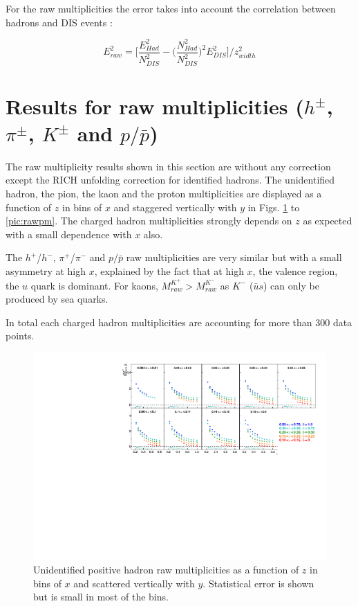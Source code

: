 For the raw multiplicities the error takes into account the correlation between hadrons and DIS events :

\begin{equation}
		E^2_{raw} = \Bigg[\frac{E^2_{Had}}{N^2_{DIS}} - \bigg( \frac{N^2_{Had}}{N^2_{DIS}} \bigg)^2 E^2_{DIS} \Bigg]/z^2_{width}
\end{equation}

\section{Results for raw multiplicities ($h^{\pm}$, $\pi^{\pm}$, $K^{\pm}$ and $p/\bar{p}$)}

The raw multiplicity results shown in this section are without any correction except the RICH unfolding correction for identified hadrons. The unidentified hadron, the pion, the kaon and the proton multiplicities are displayed as a function of $z$ in bins of $x$ and staggered vertically with $y$ in Figs. \ref{pic:rawhp} to \ref{pic:rawpm}. The charged hadron multiplicities strongly depends on $z$ as expected with a small dependence with $x$ also.

The $h^+$/$h^-$, $\pi^+$/$\pi^-$ and $p/\bar{p}$ raw multiplicities are very similar but with a small asymmetry at high $x$, explained by the fact that at high $x$, the valence region, the $u$ quark is dominant. For kaons, $M_{raw}^{K^+} > M_{raw}^{K^-}$ as $K^-$ ($\bar{u}s$) can only be produced by sea quarks.

In total each charged hadron multiplicities are accounting for more than 300 data points.

\begin{figure}[!h]
	\includegraphics[scale=0.85]{./gfx/rawhp.pdf}
	\caption{Unidentified positive hadron raw multiplicities as a function of $z$ in bins of $x$ and scattered vertically with $y$. Statistical error is shown but is small in most of the bins.}
	\label{pic:rawhp}
\end{figure}

